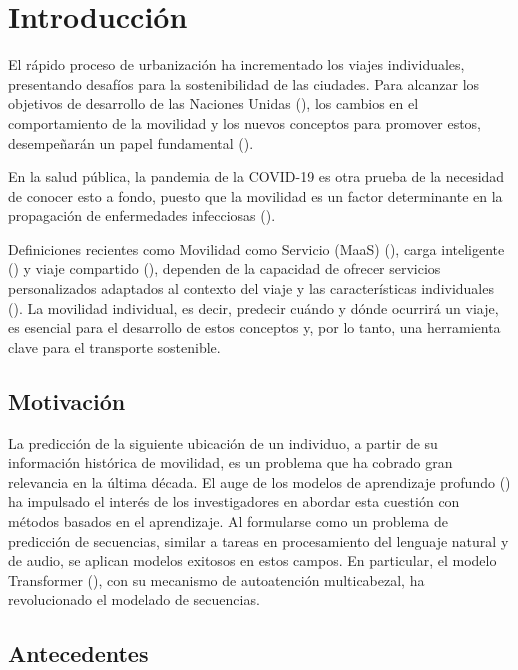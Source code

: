 \chapter*{Introducción}\label{chapter:introduction}

El rápido proceso de urbanización ha incrementado los viajes 
individuales, presentando desafíos para la sostenibilidad de las 
ciudades. Para alcanzar los objetivos de desarrollo de las 
Naciones Unidas (\cite{Griggs2013}), los cambios en el comportamiento de 
la movilidad y los nuevos conceptos para promover estos, 
desempeñarán un papel fundamental
 (\cite{Martin2021}). 
 
En la salud p\'ublica, la pandemia de la COVID-19 es otra prueba
de la necesidad de conocer esto a fondo, puesto
que la movilidad es un factor determinante en la propagación
de enfermedades infecciosas  (\cite{Kraemer2020}). 

Definiciones recientes como
Movilidad como
Servicio (MaaS) (\cite{Reck2022}), carga inteligente (\cite{Xu2018}) y 
viaje compartido (\cite{Huang2019}), dependen de la capacidad de ofrecer 
servicios personalizados adaptados al contexto del viaje y las 
características individuales (\cite{Ma2022}).
La movilidad individual, es decir, predecir cuándo y dónde ocurrirá 
un viaje, es esencial para el desarrollo de estos conceptos y, 
por lo tanto, una herramienta clave para el transporte sostenible.

\section{Motivación}
La predicción de la siguiente ubicación de un individuo, a partir 
de su información histórica de movilidad, es un problema que ha cobrado 
gran relevancia en la última década. El auge de los modelos de 
aprendizaje profundo (\cite{luca2021survey}) ha impulsado el interés de 
los investigadores en abordar esta cuesti\'on con métodos basados 
en el aprendizaje.  Al formularse como un problema de predicción 
de secuencias, similar a tareas en procesamiento del lenguaje 
natural y de audio, se aplican modelos exitosos en estos campos.  
En particular, el modelo Transformer (\cite{vaswani2017attention}), con su mecanismo 
de autoatención multicabezal, ha revolucionado el modelado de 
secuencias.
\newpage
\section{Antecedentes}

